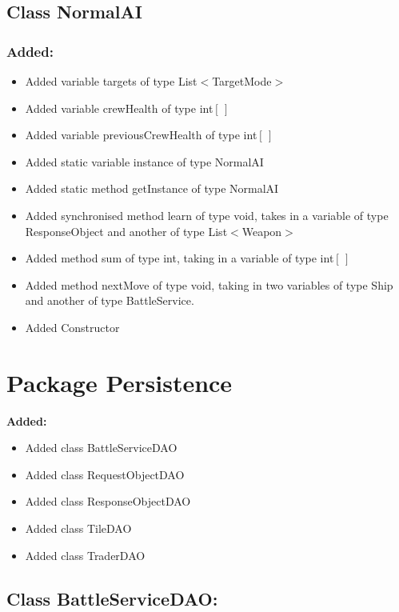 \documentclass{article}
\begin{document}

\subsection{Class NormalAI}

\subsubsection{Added:}
\begin{itemize}
\item Added variable targets of type List$<$TargetMode$>$
\item Added variable crewHealth of type int$[\, ]$
\item Added variable previousCrewHealth of type int$[\, ]$
\item Added static variable instance of type NormalAI
\item Added static method getInstance of type NormalAI
\item Added synchronised method learn of type void, takes in a variable of type ResponseObject and another of type List$<$Weapon$>$
\item Added method sum of type int, taking in a variable of type int$[\, ]$
\item Added method nextMove of type void, taking in two variables of type Ship and another of type BattleService.
\item Added Constructor
\end{itemize}


\section{Package Persistence}

\textbf{Added:}
\begin{itemize}
\item Added class BattleServiceDAO
\item Added class RequestObjectDAO
\item Added class ResponseObjectDAO
\item Added class TileDAO
\item Added class TraderDAO
\end{itemize}


\subsection{Class BattleServiceDAO:}
\end{document}
